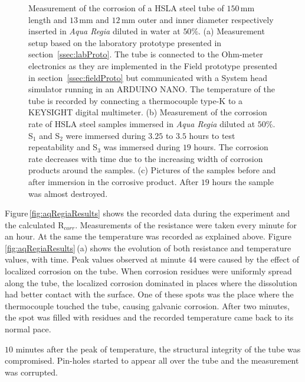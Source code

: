 \documentclass[journal,twoside,web]{ieeecolor}
\begin{document}
\begin{figure}[!t]
\caption{Measurement of the corrosion of a HSLA steel tube of $150$\,mm length and $13$\,mm and $12$\,mm outer and inner diameter respectively inserted in \textit{Aqua Regia} diluted in water at $50\%$. (a) Measurement setup based on the laboratory prototype presented in section~\ref{ssec:labProto}. The tube is connected to the Ohm-meter electronics as they are implemented in the Field prototype presented in section~\ref{ssec:fieldProto} but communicated with a System head simulator running in an ARDUINO NANO. The temperature of the tube is recorded by connecting a thermocouple type-K to a KEYSIGHT digital multimeter. (b) Measurement of the corrosion rate of HSLA steel samples immersed in \textit{Aqua Regia} diluted at $50\%$. S$_{1}$ and S$_{2}$ were immersed during $3.25$ to $3.5$ hours to test repeatability and S$_{3}$ was immersed during $19$ hours. The corrosion rate decreases with time due to the increasing width of corrosion products around the samples. (c) Pictures of the samples before and after immersion in the corrosive product. After $19$ hours the sample was almost destroyed.}
\label{fig:aquaRegia}
\end{figure}

Figure\,\ref{fig:aqRegiaResults} shows the recorded data during the experiment and the calculated R$_{corr}$. Measurements of the resistance were taken every minute for an hour. At the same the temperature was recorded as explained above. Figure\,\ref{fig:aqRegiaResults}\,(a) shows the evolution of both resistance and temperature values, with time. Peak values observed at minute $44$ were caused by the effect of localized corrosion on the tube. When corrosion residues were uniformly spread along the tube, the localized corrosion dominated in places where the dissolution had better contact with the surface. One of these spots was the place where the thermocouple touched the tube, causing galvanic corrosion. After two minutes, the spot was filled with residues and the recorded temperature came back to its normal pace.

$10$ minutes after the peak of temperature, the structural integrity of the tube was compromised. Pin-holes started to appear all over the tube and the measurement was corrupted.
\end{document}
